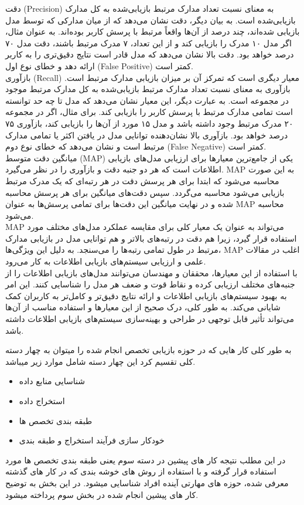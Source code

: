 دقت (Precision) به معنای نسبت تعداد مدارک مرتبط بازیابی‌شده به کل مدارک بازیابی‌شده است. به بیان دیگر، دقت نشان می‌دهد که از میان مدارکی که توسط مدل بازیابی شده‌اند، چند درصد از آن‌ها واقعاً مرتبط با پرسش کاربر بوده‌اند. به عنوان مثال، اگر مدل ۱۰ مدرک را بازیابی کند و از این تعداد، ۷ مدرک مرتبط باشند، دقت مدل ۷۰ درصد خواهد بود. دقت بالا نشان می‌دهد که مدل قادر است نتایج دقیق‌تری را به کاربر ارائه دهد و خطای نوع اول (False Positive) کمتر است.
\\
بازآوری (Recall) معیار دیگری است که تمرکز آن بر میزان بازیابی مدارک مرتبط است. بازآوری به معنای نسبت تعداد مدارک مرتبط بازیابی‌شده به کل مدارک مرتبط موجود در مجموعه است. به عبارت دیگر، این معیار نشان می‌دهد که مدل تا چه حد توانسته است تمامی مدارک مرتبط با پرسش کاربر را بازیابی کند. برای مثال، اگر در مجموعه ۲۰ مدرک مرتبط وجود داشته باشد و مدل ۱۵ مورد از آن‌ها را بازیابی کند، بازآوری ۷۵ درصد خواهد بود. بازآوری بالا نشان‌دهنده توانایی مدل در یافتن اکثر یا تمامی مدارک مرتبط است و نشان می‌دهد که خطای نوع دوم (False Negative) کمتر است.
\\
میانگین دقت متوسط (MAP) یکی از جامع‌ترین معیارها برای ارزیابی مدل‌های بازیابی اطلاعات است که هر دو جنبه دقت و بازآوری را در نظر می‌گیرد. MAP به این صورت محاسبه می‌شود که ابتدا برای هر پرسش دقت در هر رتبه‌ای که یک مدرک مرتبط بازیابی می‌شود محاسبه می‌گردد. سپس دقت‌های میانگین برای هر پرسش محاسبه شده و در نهایت میانگین این دقت‌ها برای تمامی پرسش‌ها به عنوان MAP محاسبه می‌شود.
\\
MAP می‌تواند به عنوان یک معیار کلی برای مقایسه عملکرد مدل‌های مختلف مورد استفاده قرار گیرد، زیرا هم دقت در رتبه‌های بالاتر و هم توانایی مدل در بازیابی مدارک مرتبط در طول تمامی رتبه‌ها را می‌سنجد. به دلیل این ویژگی‌ها، MAP اغلب در مقالات علمی و ارزیابی سیستم‌های بازیابی اطلاعات به کار می‌رود.
\\
با استفاده از این معیارها، محققان و مهندسان می‌توانند مدل‌های بازیابی اطلاعات را از جنبه‌های مختلف ارزیابی کرده و نقاط قوت و ضعف هر مدل را شناسایی کنند. این امر به بهبود سیستم‌های بازیابی اطلاعات و ارائه نتایج دقیق‌تر و کامل‌تر به کاربران کمک شایانی می‌کند. به طور کلی، درک صحیح از این معیارها و استفاده مناسب از آن‌ها می‌تواند تأثیر قابل توجهی در طراحی و بهینه‌سازی سیستم‌های بازیابی اطلاعات داشته باشد.


به طور کلی کار هایی که در حوزه بازیابی تخصص انجام شده را میتوان به چهار دسته کلی تقسیم کرد این چهار دسته شامل موارد زیر میباشد.
\begin{itemize}
	\item شناسایی منابع داده
	\item استخراج داده
	\item طبقه بندی تخصص ها
	\item خودکار سازی فرآیند استخراج و طبقه بندی
\end{itemize}
در این مطلب نتیجه کار های پیشین در دسته سوم یعنی طبقه بندی تخصص ها مورد استفاده قرار گرفته و با استفاده از روش های خوشه بندی که در کار های گذشته معرفی شده، حوزه های مهارتی آینده افراد شناسایی میشود.
در این بخش به توضیح کار های پیشین انجام شده در بخش سوم پرداخته میشود.
\cite{expret}
